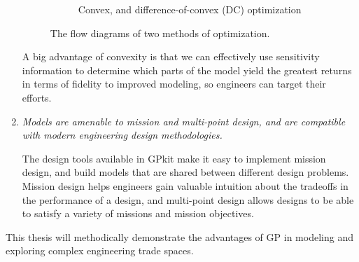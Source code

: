 \begin{enumerate}
\begin{figure*}[!b]
\begin{subfigure}[b]{0.5\linewidth}
\begin{center}
{}
            \end{center}
            \caption{Convex, and difference-of-convex (DC) optimization}
        \end{subfigure}
        \caption{The flow diagrams of two methods of optimization.}
        \label{f:optflow}
    \end{figure*}

    A big advantage of convexity is that we can effectively use sensitivity information
    to determine which parts of the
    model yield the greatest returns in terms of fidelity to improved modeling, so engineers can target
    their efforts.

    \item \textit{Models are amenable to mission and multi-point design, and are compatible with modern
    engineering design methodologies.}

    The design tools available in GPkit make it easy to
    implement mission design, and build models that are shared between
    different design problems. Mission design helps engineers gain valuable intuition about
    the tradeoffs in the performance of a design, and multi-point design allows designs to
    be able to satisfy a variety of missions and mission objectives.

\end{enumerate}

This thesis will methodically demonstrate the advantages of \gls{GP} in modeling
and exploring complex engineering trade spaces.



